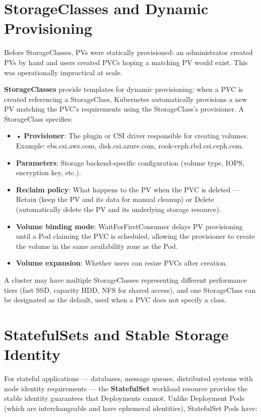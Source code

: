 \section{StorageClasses and Dynamic Provisioning}
Before StorageClasses, PVs were statically provisioned: an administrator created PVs by hand and users created PVCs hoping a matching PV would exist. This was operationally impractical at scale.

\textbf{StorageClasses} provide templates for dynamic provisioning: when a PVC is created referencing a StorageClass, Kubernetes automatically provisions a new PV matching the PVC's requirements using the StorageClass's provisioner. A StorageClass specifies:

\begin{itemize}
  \item • \textbf{Provisioner}: The plugin or CSI driver responsible for creating volumes. Example: ebs.csi.aws.com, disk.csi.azure.com, rook-ceph.rbd.csi.ceph.com.
  \item \textbf{Parameters}: Storage backend-specific configuration (volume type, IOPS, encryption key, etc.).
  \item \textbf{Reclaim policy}: What happens to the PV when the PVC is deleted --- Retain (keep the PV and its data for manual cleanup) or Delete (automatically delete the PV and its underlying storage resource).
  \item \textbf{Volume binding mode}: WaitForFirstConsumer delays PV provisioning until a Pod claiming the PVC is scheduled, allowing the provisioner to create the volume in the same availability zone as the Pod.
  \item \textbf{Volume expansion}: Whether users can resize PVCs after creation.
\end{itemize}

A cluster may have multiple StorageClasses representing different performance tiers (fast SSD, capacity HDD, NFS for shared access), and one StorageClass can be designated as the default, used when a PVC does not specify a class.

\section{StatefulSets and Stable Storage Identity}
For stateful applications --- databases, message queues, distributed systems with node identity requirements --- the \textbf{StatefulSet} workload resource provides the stable identity guarantees that Deployments cannot. Unlike Deployment Pods (which are interchangeable and have ephemeral identities), StatefulSet Pods have:

